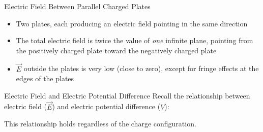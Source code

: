 \documentclass[12pt,aspectratio=169]{beamer}
\begin{document}
\begin{frame}{Electric Field Between Parallel Charged Plates}
  \begin{center}
  \end{center}
  \begin{itemize}
  \item Two plates, each producing an electric field pointing in
    the same direction
  \item The total electric field is twice the value of \emph{one} infinite
    plane, pointing from the positively charged plate toward the negatively
    charged plate

  \item $\vec E$ outside the plates is very low (close to zero), except for
    fringe effects at the edges of the plates
  \end{itemize}
\end{frame}



\begin{frame}{Electric Field and Electric Potential Difference}
  Recall the relationship between electric field ($\vec E$) and electric
  potential difference ($V$):
    
  
  This relationship holds regardless of the charge configuration.
\end{frame}
\end{document}
